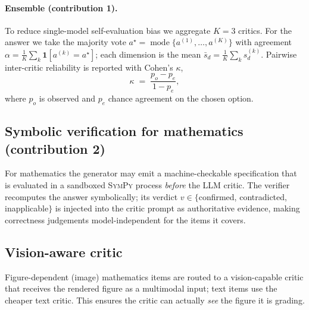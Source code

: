 \documentclass[11pt]{article}
\begin{document}
\paragraph{Ensemble (contribution 1).} To reduce single-model
self-evaluation bias we aggregate $K=3$ critics. For the answer we take the
majority vote $a^\star=\operatorname{mode}\{a^{(1)},\dots,a^{(K)}\}$ with
agreement $\alpha=\frac1K\sum_k \mathbf 1[a^{(k)}=a^\star]$; each dimension is
the mean $\bar s_d=\frac1K\sum_k s_d^{(k)}$. Pairwise inter-critic reliability
is reported with Cohen's $\kappa$,
\begin{equation}
\kappa \;=\; \frac{p_o - p_e}{1 - p_e},
\label{eq:kappa}
\end{equation}
where $p_o$ is observed and $p_e$ chance agreement on the chosen option.

\subsection{Symbolic verification for mathematics (contribution 2)}
For mathematics the generator may emit a machine-checkable specification that
is evaluated in a sandboxed \textsc{SymPy} process \emph{before} the LLM critic.
The verifier recomputes the answer symbolically; its verdict
$v\in\{$confirmed, contradicted, inapplicable$\}$ is injected into the critic
prompt as authoritative evidence, making correctness judgements
model-independent for the items it covers.

\subsection{Vision-aware critic}
Figure-dependent (image) mathematics items are routed to a vision-capable
critic that receives the rendered figure as a multimodal input; text items use
the cheaper text critic. This ensures the critic can actually \emph{see} the
figure it is grading.
\end{document}
